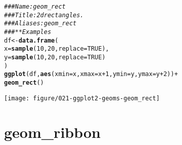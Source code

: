 \documentclass[a4paper,titlepage]{tufte-handout}\usepackage[]{graphicx}\usepackage[]{color}
\makeatletter
\def\maxwidth{ %
  \ifdim\Gin@nat@width>\linewidth
    \linewidth
  \else
    \Gin@nat@width
  \fi
}
\newcommand{\hlnum}[1]{\textcolor[rgb]{0.686,0.059,0.569}{#1}}%
\newcommand{\hlcom}[1]{\textcolor[rgb]{0.678,0.584,0.686}{\textit{#1}}}%
\newcommand{\hlopt}[1]{\textcolor[rgb]{0,0,0}{#1}}%
\newcommand{\hlstd}[1]{\textcolor[rgb]{0.345,0.345,0.345}{#1}}%
\newcommand{\hlkwb}[1]{\textcolor[rgb]{0.69,0.353,0.396}{#1}}%
\newcommand{\hlkwc}[1]{\textcolor[rgb]{0.333,0.667,0.333}{#1}}%
\newcommand{\hlkwd}[1]{\textcolor[rgb]{0.737,0.353,0.396}{\textbf{#1}}}%
\newenvironment{kframe}{%
 \def\at@end@of@kframe{}%
 \ifinner\ifhmode%
  \def\at@end@of@kframe{\end{minipage}}%
  \begin{minipage}{\columnwidth}%
 \fi\fi%
 \def\FrameCommand##1{\hskip\@totalleftmargin \hskip-\fboxsep
 \colorbox{shadecolor}{##1}\hskip-\fboxsep
     \hskip-\linewidth \hskip-\@totalleftmargin \hskip\columnwidth}%
 \MakeFramed {\advance\hsize-\width
   \@totalleftmargin\z@ \linewidth\hsize
   \@setminipage}}%
 {\par\unskip\endMakeFramed%
 \at@end@of@kframe}
\newenvironment{knitrout}{}{} %
\makeatother
\begin{document}
\begin{knitrout}
\color{fgcolor}\begin{kframe}
\begin{alltt}
\hlcom{### Name: geom_rect}
\hlcom{### Title: 2d rectangles.}
\hlcom{### Aliases: geom_rect}
\hlcom{### ** Examples}
\hlstd{df} \hlkwb{<-} \hlkwd{data.frame}\hlstd{(}
  \hlkwc{x} \hlstd{=} \hlkwd{sample}\hlstd{(}\hlnum{10}\hlstd{,} \hlnum{20}\hlstd{,} \hlkwc{replace} \hlstd{=} \hlnum{TRUE}\hlstd{),}
  \hlkwc{y} \hlstd{=} \hlkwd{sample}\hlstd{(}\hlnum{10}\hlstd{,} \hlnum{20}\hlstd{,} \hlkwc{replace} \hlstd{=} \hlnum{TRUE}\hlstd{)}
\hlstd{)}
\hlkwd{ggplot}\hlstd{(df,} \hlkwd{aes}\hlstd{(}\hlkwc{xmin} \hlstd{= x,} \hlkwc{xmax} \hlstd{= x} \hlopt{+} \hlnum{1}\hlstd{,} \hlkwc{ymin} \hlstd{= y,} \hlkwc{ymax} \hlstd{= y} \hlopt{+} \hlnum{2}\hlstd{))} \hlopt{+}
\hlkwd{geom_rect}\hlstd{()}
\end{alltt}
\end{kframe}
\texttt{[image: figure/021-ggplot2-geoms-geom\_rect]} 
\begin{kframe}\begin{alltt}


\end{alltt}
\end{kframe}
\end{knitrout}



\section{geom\_ribbon}
\end{document}
